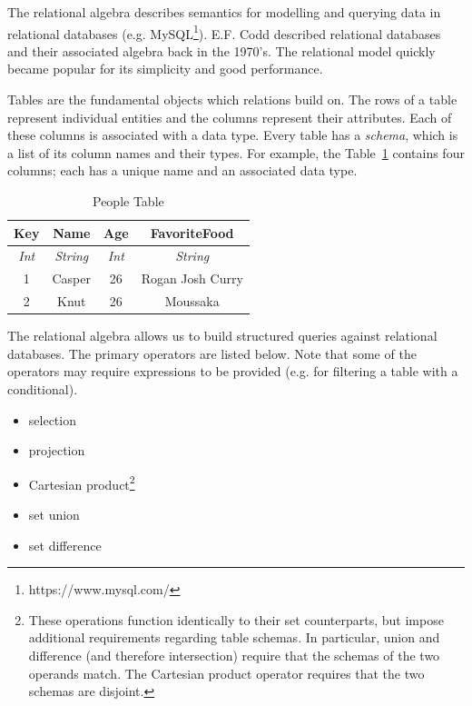 \documentclass[12pt]{report}
\begin{document}
The relational algebra describes semantics for modelling and querying data in relational databases (e.g. MySQL\footnote{https://www.mysql.com/}).
E.F. Codd described relational databases and their associated algebra back in the 1970's\cite{codd70}.
The relational model quickly became popular for its simplicity and good performance.

Tables are the fundamental objects which relations build on.
The rows of a table represent individual entities and the columns represent their attributes.
Each of these columns is associated with a data type.
Every table has a \textit{schema}, which is a list of its column names and their types.
For example, the Table~\ref{tab:people_table} contains four columns; each has a unique name and an associated data type.

\begin{table}[tb]
    \caption{People Table}
    \label{tab:people_table}
    \centering

    \begin{tabular}{|c|c|c|c|}
    \hline

    \hline
    \textbf{Key} & \textbf{Name} & \textbf{Age} & \textbf{FavoriteFood} \\
    \hline
    \textit{Int} & \textit{String} & \textit{Int} & \textit{String} \\
    \hline
    \hline
       1 & Casper & 26 & Rogan Josh Curry \\
       2 & Knut & 26 & Moussaka \\
    \hline

    \end{tabular}
\end{table}

The relational algebra allows us to build structured queries against relational databases.
The primary operators are listed below.
Note that some of the operators may require expressions to be provided (e.g. for filtering a table with a conditional).

\begin{itemize}
    \item selection
    \item projection
    \item Cartesian product\footnote{\label{fn:set_ops} These operations function identically to their set counterparts, but impose additional requirements regarding table schemas. In particular, union and difference (and therefore intersection) require that the schemas of the two operands match. The Cartesian product operator requires that the two schemas are disjoint.}
    \item set union\footnotemark[\ref{fn:set_ops}]
    \item set difference\footnotemark[\ref{fn:set_ops}]
\end{itemize}
\end{document}
